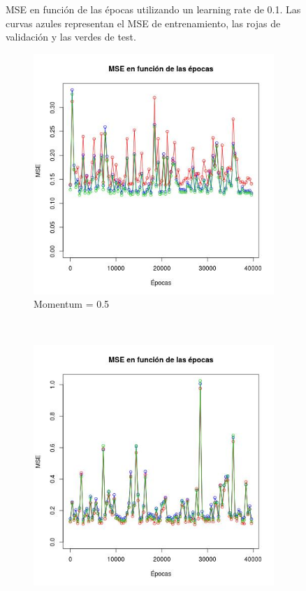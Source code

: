 \documentclass[12pt, a4paper]{article}
\begin{document}
\begin{figure}
    \caption{MSE en función de las épocas utilizando un learning rate de 0.1. Las curvas azules representan el MSE de entrenamiento, las rojas de validación y las verdes de test.}
\end{figure}

\begin{figure}
    \centering

    \begin{subfigure}[b]{0.45\textwidth}
        \includegraphics[width=\textwidth]{mse21d}
        \caption{Momentum = 0.5}
    \end{subfigure}
      ~ %
    \begin{subfigure}[b]{0.45\textwidth}
        \includegraphics[width=\textwidth]{mse31}

\end{subfigure}
\end{figure}
\end{document}
